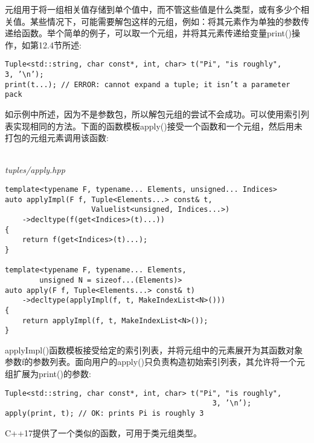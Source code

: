 元组用于将一组相关值存储到单个值中，而不管这些值是什么类型，或有多少个相关值。某些情况下，可能需要解包这样的元组，例如：将其元素作为单独的参数传递给函数。举个简单的例子，可以取一个元组，并将其元素传递给变量print()操作，如第12.4节所述:

\begin{lstlisting}[style=styleCXX]
Tuple<std::string, char const*, int, char> t("Pi", "is roughly",
3, ’\n’);
print(t...); // ERROR: cannot expand a tuple; it isn’t a parameter pack
\end{lstlisting}

如示例中所述，因为不是参数包，所以解包元组的尝试不会成功。可以使用索引列表实现相同的方法。下面的函数模板apply()接受一个函数和一个元组，然后用未打包的元组元素调用该函数:

\hspace*{\fill} \\ %
\noindent
\textit{tuples/apply.hpp}
\begin{lstlisting}[style=styleCXX]
template<typename F, typename... Elements, unsigned... Indices>
auto applyImpl(F f, Tuple<Elements...> const& t,
					Valuelist<unsigned, Indices...>)
	->decltype(f(get<Indices>(t)...))
{
	return f(get<Indices>(t)...);
}

template<typename F, typename... Elements,
		unsigned N = sizeof...(Elements)>
auto apply(F f, Tuple<Elements...> const& t)
	->decltype(applyImpl(f, t, MakeIndexList<N>()))
{
	return applyImpl(f, t, MakeIndexList<N>());
}
\end{lstlisting}

applyImpl()函数模板接受给定的索引列表，并将元组中的元素展开为其函数对象参数f的参数列表。面向用户的apply()只负责构造初始索引列表，其允许将一个元组扩展为print()的参数:

\begin{lstlisting}[style=styleCXX]
Tuple<std::string, char const*, int, char> t("Pi", "is roughly",
												3, ’\n’);
apply(print, t); // OK: prints Pi is roughly 3
\end{lstlisting}

C++17提供了一个类似的函数，可用于类元组类型。






































